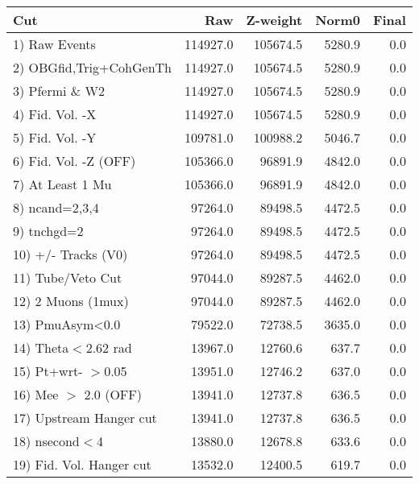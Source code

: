  \begin{table}[h!]\centering
 \begin{tabular}{||l||r|r|r|r||}
 \hline
 \hline
 Cut & Raw & Z-weight & Norm0 & Final \\
 \hline
  1) Raw Events           &    114927.0 &    105674.5 &      5280.9 &         0.0 \\
  2) OBGfid,Trig+CohGenTh &    114927.0 &    105674.5 &      5280.9 &         0.0 \\
  3) Pfermi \& W2         &    114927.0 &    105674.5 &      5280.9 &         0.0 \\
  4) Fid. Vol. -X         &    114927.0 &    105674.5 &      5280.9 &         0.0 \\
  5) Fid. Vol. -Y         &    109781.0 &    100988.2 &      5046.7 &         0.0 \\
  6) Fid. Vol. -Z (OFF)   &    105366.0 &     96891.9 &      4842.0 &         0.0 \\
  7) At Least 1 Mu        &    105366.0 &     96891.9 &      4842.0 &         0.0 \\
  8) ncand=2,3,4          &     97264.0 &     89498.5 &      4472.5 &         0.0 \\
  9) tnchgd=2             &     97264.0 &     89498.5 &      4472.5 &         0.0 \\
 10) +/- Tracks (V0)      &     97264.0 &     89498.5 &      4472.5 &         0.0 \\
 11) Tube/Veto Cut        &     97044.0 &     89287.5 &      4462.0 &         0.0 \\
 12) 2 Muons (1mux)       &     97044.0 &     89287.5 &      4462.0 &         0.0 \\
 13) PmuAsym<0.0          &     79522.0 &     72738.5 &      3635.0 &         0.0 \\
 14) Theta$<$2.62 rad     &     13967.0 &     12760.6 &       637.7 &         0.0 \\
 15) Pt+wrt- $>$0.05      &     13951.0 &     12746.2 &       637.0 &         0.0 \\
 16) Mee $>$ 2.0  (OFF)   &     13941.0 &     12737.8 &       636.5 &         0.0 \\
 17) Upstream Hanger cut  &     13941.0 &     12737.8 &       636.5 &         0.0 \\
 18) nsecond$<$4          &     13880.0 &     12678.8 &       633.6 &         0.0 \\
 19) Fid. Vol. Hanger cut &     13532.0 &     12400.5 &       619.7 &         0.0 \\

\end{tabular}
\end{table}
